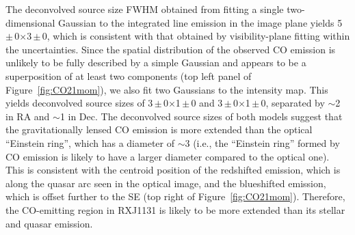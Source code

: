 \documentclass[]{emulateapj}
\newcommand{\pmm}{\,$\pm$\,}
\newcommand{\Fig}[1]{Figure~\ref{fig:#1}}
\begin{document}
The deconvolved source size FWHM obtained from fitting a single two-dimensional Gaussian
to the integrated line emission in the image plane yields 5\pmm0$\times$3\pmm0,
which is consistent with that obtained by visibility-plane fitting within the uncertainties.
Since the spatial distribution of the observed CO emission is unlikely to be fully described by a simple Gaussian
and appears to be a superposition of at least two components (top left panel of \Fig{CO21mom}),
we also fit two Gaussians to the intensity map.
This yields deconvolved source sizes of
3\pmm0$\times$1\pmm0 and 3\pmm0$\times$1\pmm0, separated by $\sim$2 in RA and $\sim$1 in Dec.
The deconvolved source sizes of both models suggest that the gravitationally lensed CO emission is more extended
than the optical
``Einstein ring'', which has a diameter of $\sim$3
(i.e., the ``Einstein ring'' formed by CO emission is likely to have a larger diameter compared to the optical one).
This is consistent with the centroid position of the redshifted emission, which is along the quasar arc seen in the optical image,
and the blueshifted emission, which is offset further to the SE (top right of \Fig{CO21mom}).
Therefore, the CO-emitting region in RXJ1131 is likely to be more extended than its stellar and quasar emission.
\end{document}
